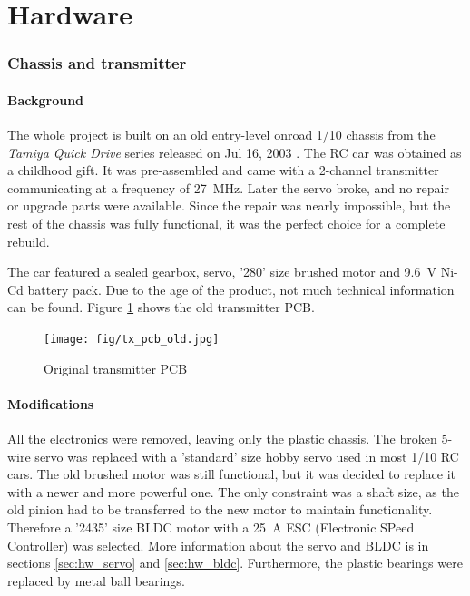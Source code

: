 


\part{Hardware}
\label{chap:hw}


\section{Chassis and transmitter}
\label{sec:hw_base}
\subsection{Background}
The whole project is built on an old entry-level onroad 1/10 chassis from the \textit{Tamiya Quick Drive} series released on Jul 16, 2003 \cite{tamiya}. The RC car was obtained as a childhood gift. It was pre-assembled and came with a 2-channel transmitter communicating at a frequency of \SI{27}{\MHz}. Later the servo broke, and no repair or upgrade parts were available. Since the repair was nearly impossible, but the rest of the chassis was fully functional, it was the perfect choice for a complete rebuild.

The car featured a sealed gearbox, servo, '280' size brushed motor and \SI{9.6}{\V} Ni-Cd battery pack. Due to the age of the product, not much technical information can be found. Figure \ref{fig:tx_old_pcb} shows the old transmitter PCB.
\begin{figure}[ht]
\centering
\texttt{[image: fig/tx\_pcb\_old.jpg]}
\caption{Original transmitter PCB}
\label{fig:tx_old_pcb}
\end{figure}

\subsection{Modifications}
\label{sub:hw_mods}
All the electronics were removed, leaving only the plastic chassis. The broken 5-wire servo was replaced with a 'standard' size hobby servo used in most 1/10 RC cars. The old brushed motor was still functional, but it was decided to replace it with a newer and more powerful one. The only constraint was a shaft size, as the old pinion had to be transferred to the new motor to maintain functionality. Therefore a '2435' size BLDC motor with a \SI{25}{\A} ESC (Electronic SPeed Controller) was selected. More information about the servo and BLDC is in sections \ref{sec:hw_servo} and \ref{sec:hw_bldc}. Furthermore, the plastic bearings were replaced by metal ball bearings.

